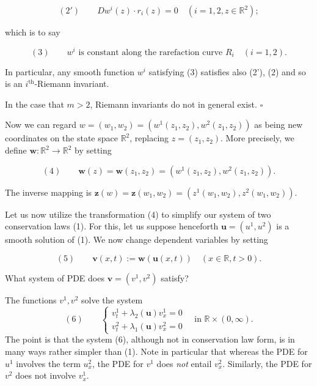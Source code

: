 $$(2') \qquad Dw^i(z)\cdot r_i(z) = 0 \quad (i=1,2, z\in\mathbb{R}^2);$$

which is to say

$$(3) \qquad w^i \text{ is constant along the rarefaction curve } R_i \quad (i=1,2).$$

In particular, any smooth function $w^i$ satisfying (3) satisfies also (2'), (2) and so is an $i^{\text{th}}$-Riemann invariant.

\begin{remark}
\label{rem:riemann-invariants-mgt2-remark}
In the case that $m>2$, Riemann invariants do not in general exist. $\square$
\end{remark}

Now we can regard $w=(w_1,w_2) = (w^1(z_1,z_2), w^2(z_1,z_2))$ as being new coordinates on the state space $\mathbb{R}^2$, replacing $z=(z_1,z_2)$. More precisely, we define $\mathbf{w}:\mathbb{R}^2\to\mathbb{R}^2$ by setting

$$(4) \qquad \mathbf{w}(z) = \mathbf{w}(z_1,z_2) = (w^1(z_1,z_2), w^2(z_1,z_2)).$$

The inverse mapping is $\mathbf{z}(w) = \mathbf{z}(w_1,w_2) = (z^1(w_1,w_2), z^2(w_1,w_2))$.

Let us now utilize the transformation (4) to simplify our system of two conservation laws (1). For this, let us suppose henceforth $\mathbf{u} = (u^1,u^2)$ is a smooth solution of (1). We now change dependent variables by setting

$$(5) \qquad \mathbf{v}(x,t) := \mathbf{w}(\mathbf{u}(x,t)) \quad (x\in\mathbb{R}, t>0).$$

What system of PDE does $\mathbf{v} = (v^1,v^2)$ satisfy?

\begin{theorem}
\label{thm:conservation-laws-riemann-invariants}
The functions $v^1, v^2$ solve the system
$$(6) \qquad \begin{cases} v^1_t + \lambda_2(\mathbf{u})v^1_x = 0 \\ v^2_t + \lambda_1(\mathbf{u})v^2_x = 0 \end{cases} \quad \text{in } \mathbb{R}\times(0,\infty).$$
The point is that the system (6), although not in conservation law form, is in many ways rather simpler than (1). Note in particular that whereas the PDE for $u^1$ involves the term $u^2_x$, the PDE for $v^1$ does \textit{not} entail $v^2_x$. Similarly, the PDE for $v^2$ does not involve $v^1_x$.
\end{theorem}

